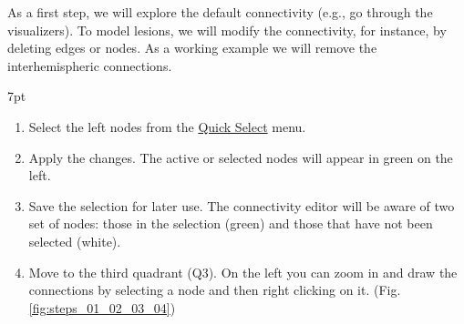 \documentclass{tufte-handout}
\newenvironment{formal}{%
  \def\FrameCommand{%
    \hspace{1pt}%
    {\color{DarkBlue}\vrule width 2pt}%
    {\color{formalshade}\vrule width 4pt}%
    \colorbox{formalshade}%
  }%
  \MakeFramed{\advance\hsize-\width\FrameRestore}%
  \noindent\hspace{-4.55pt}%
  \begin{adjustwidth}{}{7pt}%
  \vspace{2pt}\vspace{2pt}%
}
{%
  \vspace{2pt}\end{adjustwidth}\endMakeFramed%
}
\begin{document}
\noindent As a first step, we will explore the default connectivity (e.g., go through
the visualizers). To model lesions, we will modify the connectivity, for
instance, by deleting edges or nodes. As a working example we will remove the
interhemispheric connections. 


\begin{formal}
  \begin{enumerate}
  \item Select the left nodes from the \underline{Quick Select} menu. 
  \item Apply the changes. The active or selected nodes will appear in green on the left. 
  \item Save the selection for later use. The connectivity editor will be aware of two set of nodes: those in the selection (green) and those that have not been selected (white). 
  \item Move to the third quadrant (Q3). On the left you can zoom in and draw the connections by selecting a node and then right clicking on it. (Fig. \ref{fig:steps_01_02_03_04})
\end{enumerate}
\end{formal}
\end{document}
